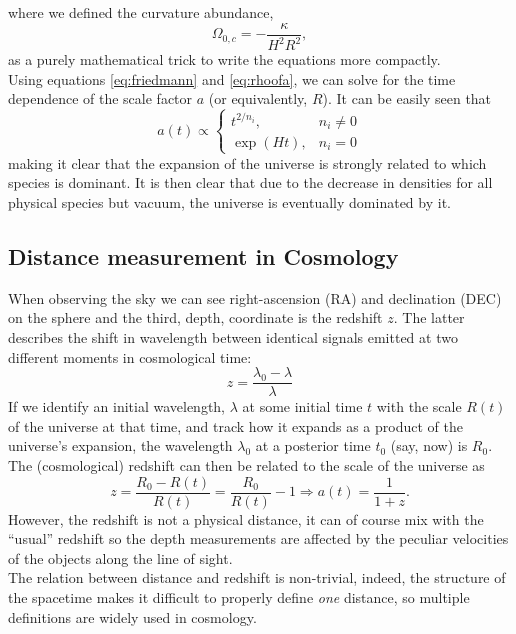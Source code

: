 \documentclass[fleqn, usenatbib]{mnras}
\begin{document}
where we defined the curvature abundance, $$\Omega_{0,c} = -\frac{\kappa}{H^2R^2},$$ as a purely mathematical trick to write the equations more compactly.\\
Using equations \ref{eq:friedmann} and \ref{eq:rhoofa}, we can solve for the time dependence of the scale factor $a$ (or equivalently, $R$). It can be easily seen that
\begin{equation}
a(t)\propto \begin{cases}
t^{2/n_i}, &n_i\neq 0\\
\exp(Ht), &n_i=0
\end{cases}
\end{equation}
making it clear that the expansion of the universe is strongly related to which species is dominant. It is then clear that due to the decrease in densities for all physical species but vacuum, the universe is eventually dominated by it.
\subsection{Distance measurement in Cosmology}
When observing the sky we can see right-ascension (RA) and declination (DEC) on the sphere and the third, depth, coordinate is the redshift $z$. The latter describes the shift in wavelength between identical signals emitted at two different moments in cosmological time:
\begin{equation}
z = \frac{\lambda_0 - \lambda}{\lambda}
\end{equation} 
If we identify an initial wavelength, $\lambda$ at some initial time $t$ with the scale $R(t)$ of the universe at that time, and track how it expands as a product of the universe's expansion, the wavelength $\lambda_0$ at a posterior time $t_0$ (say, now) is $R_0$. The (cosmological) redshift can then be related to the scale of the universe as
\begin{equation}
z = \frac{R_0 - R(t)}{R(t)} = \frac{R_0}{R(t)} - 1 \Rightarrow a(t) = \frac{1}{1+z}.
\label{eq:z}
\end{equation}
However, the redshift is not a physical distance, it can of course mix with the ``usual'' redshift so the depth measurements are affected by the peculiar velocities of the objects along the line of sight.\\
The relation between distance and redshift is non-trivial, indeed, the structure of the spacetime makes it difficult to properly define \textit{one} distance, so multiple definitions are widely used in cosmology.
\end{document}
